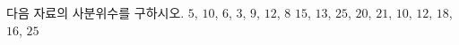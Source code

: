 다음 자료의 사분위수를 구하시오.
 $5$, $10$, $6$, $3$, $9$, $12$, $8$
 $15$, $13$, $25$, $20$, $21$, $10$, $12$, $18$, $16$, $25$
